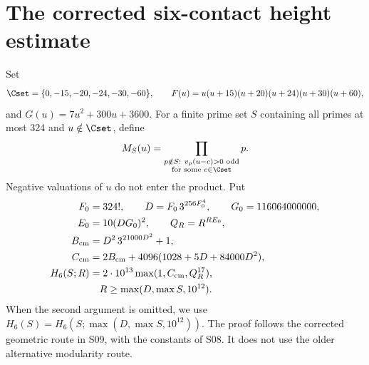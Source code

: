 \section{The corrected six-contact height estimate}\label{sec:height}
Set
\[
 \Cset=\{0,-15,-20,-24,-30,-60\},\qquad
 F(u)=u(u+15)(u+20)(u+24)(u+30)(u+60),
\]
and $G(u)=7u^2+300u+3600$. For a finite prime set $S$ containing all
primes at most 324 and $u\notin\Cset$, define
\[
 M_S(u)=\prod_{\substack{p\notin S:\ v_p(u-c)>0\text{ odd}\\
                          \text{for some }c\in\Cset}}p.
\]
Negative valuations of $u$ do not enter the product. Put
\begin{align*}
 F_0&=324!,\qquad D=F_0\,3^{256F_0^4},\qquad G_0=116064000000,\\
 E_0&=10(DG_0)^2,\qquad Q_R=R^{RE_0},\\
 B_{\rm cm}&=D^2\,3^{21000D^2}+1,\\
 C_{\rm cm}&=2B_{\rm cm}+4096(1028+5D+84000D^2),\\
 H_6(S;R)&=2\cdot10^{13}\max(1,C_{\rm cm},Q_R^{17}),\\
 &\hspace{1em}R\ge\max(D,\max S,10^{12}).
\end{align*}
When the second argument is omitted, we use
$H_6(S)=H_6(S;\max(D,\max S,10^{12}))$.
The proof follows the corrected geometric route in S09, with the
constants of S08. It does not use the older alternative modularity route.

